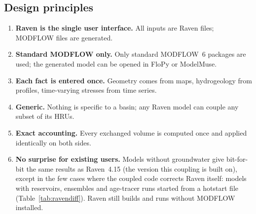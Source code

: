 \subsection{Design principles}
\begin{enumerate}
\item \textbf{Raven is the single user interface.} All inputs are Raven files; MODFLOW files are generated.
\item \textbf{Standard MODFLOW only.} Only standard MODFLOW~6 packages are used; the generated model can be opened in
FloPy or ModelMuse.
\item \textbf{Each fact is entered once.} Geometry comes from maps, hydrogeology from profiles, time-varying stresses
from time series.
\item \textbf{Generic.} Nothing is specific to a basin; any Raven model can couple any subset of its HRUs.
\item \textbf{Exact accounting.} Every exchanged volume is computed once and applied identically on both sides.
\item \textbf{No surprise for existing users.} Models without groundwater give bit-for-bit the same results as
Raven~4.15 (the version this coupling is built on), except in the few cases where the coupled code corrects Raven
itself: models with reservoirs, ensembles and age-tracer runs started from a hotstart file (Table~\ref{tab:ravendiff}). Raven still builds
and runs without MODFLOW installed.
\end{enumerate}


